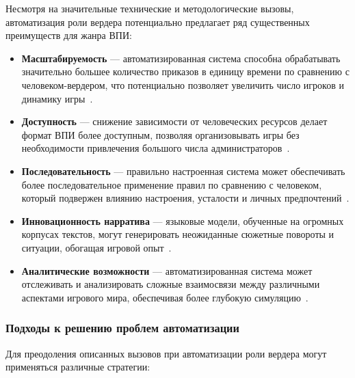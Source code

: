 Несмотря на значительные технические и методологические вызовы, автоматизация роли вердера потенциально предлагает ряд существенных преимуществ для жанра ВПИ:

\begin{itemize}
    \item \textbf{Масштабируемость} — автоматизированная система способна обрабатывать значительно большее количество приказов в единицу времени по сравнению с человеком-вердером, что потенциально позволяет увеличить число игроков и динамику игры~\cite{ai-game-simulation}.

    \item \textbf{Доступность} — снижение зависимости от человеческих ресурсов делает формат ВПИ более доступным, позволяя организовывать игры без необходимости привлечения большого числа администраторов~\cite{ai-narrative}.

    \item \textbf{Последовательность} — правильно настроенная система может обеспечивать более последовательное применение правил по сравнению с человеком, который подвержен влиянию настроения, усталости и личных предпочтений~\cite{llm-applications}.

    \item \textbf{Инновационность нарратива} — языковые модели, обученные на огромных корпусах текстов, могут генерировать неожиданные сюжетные повороты и ситуации, обогащая игровой опыт~\cite{ai-narrative}.

    \item \textbf{Аналитические возможности} — автоматизированная система может отслеживать и анализировать сложные взаимосвязи между различными аспектами игрового мира, обеспечивая более глубокую симуляцию~\cite{ai-game-simulation}.
\end{itemize}

\subsubsection{Подходы к решению проблем автоматизации}

Для преодоления описанных вызовов при автоматизации роли вердера могут применяться различные стратегии:

